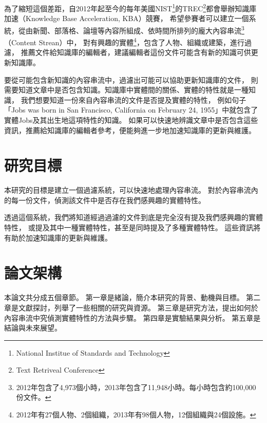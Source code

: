 為了縮短這個差距，自2012年起至今的每年美國NIST\footnote{National Institue of Standards and Technology}的TREC\footnote{Text Retriveal Conference}都會舉辦知識庫加速（Knowledge Base Acceleration, KBA）競賽，
希望參賽者可以建立一個系統，從由新聞、部落格、論壇等內容所組成、依時間所排列的龐大內容串流\footnote{2012年包含了4,973個小時，2013年包含了11,948小時。\cite{kba2013}每小時包含約100,000份文件。}（Content Strean）中，
對有興趣的實體\footnote{2012年有27個人物、2個組織，2013年有98個人物，12個組織與24個設施。}，包含了人物、組織或建築，進行過濾，
推薦文件給知識庫的編輯者，建議編輯者這份文件可能含有新的知識可供更新知識庫。

要從可能包含新知識的內容串流中，過濾出可能可以協助更新知識庫的文件，
則需要知道文章中是否包含知識。知識庫中實體間的關係、實體的特性就是一種知識，
我們想要知道一份來自內容串流的文件是否提及實體的特性，
例如句子「Jobs was born in San Francisco, California on February 24, 1955」中就包含了實體Jobs及其出生地這項特性的知識。
如果可以快速地辨識文章中是否包含這些資訊，推薦給知識庫的編輯者參考，便能夠進一步地加速知識庫的更新與維護。

%
%
\section{研究目標}
本研究的目標是建立一個過濾系統，可以快速地處理內容串流。
對於內容串流內的每一份文件，偵測該文件中是否存在我們感興趣的實體特性。

透過這個系統，我們將知道經過過濾的文件到底是完全沒有提及我們感興趣的實體特性，
或提及其中一種實體特性，甚至是同時提及了多種實體特性。
這些資訊將有助於加速知識庫的更新與維護。

%
%
\section{論文架構}
本論文共分成五個章節。
第一章是緒論，簡介本研究的背景、動機與目標。
第二章是文獻探討，列舉了一些相關的研究與資源。
第三章是研究方法，提出如何於內容串流中究偵測實體特性的方法與步驟。
第四章是實驗結果與分析。    %
第五章是結論與未來展望。    %

